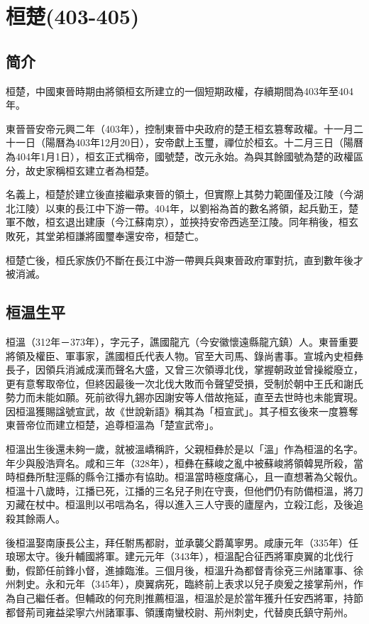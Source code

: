 
\section{桓楚\tiny(403-405)}

\subsection{简介}

桓楚，中國東晉時期由將領桓玄所建立的一個短期政權，存續期間為403年至404年。

東晉晉安帝元興二年（403年），控制東晉中央政府的楚王桓玄篡奪政權。十一月二十一日（陽曆為403年12月20日），安帝獻上玉璽，禪位於桓玄。十二月三日（陽曆為404年1月1日），桓玄正式稱帝，國號楚，改元永始。為與其餘國號為楚的政權區分，故史家稱桓玄建立者為桓楚。

名義上，桓楚於建立後直接繼承東晉的領土，但實際上其勢力範圍僅及江陵（今湖北江陵）以東的長江中下游一帶。404年，以劉裕為首的數名將領，起兵勤王，楚軍不敵，桓玄退出建康（今江蘇南京），並挾持安帝西逃至江陵。同年稍後，桓玄敗死，其堂弟桓謙將國璽奉還安帝，桓楚亡。

桓楚亡後，桓氏家族仍不斷在長江中游一帶興兵與東晉政府軍對抗，直到數年後才被消滅。

\subsection{桓温生平}

桓溫（312年－373年），字元子，譙國龍亢（今安徽懷遠縣龍亢鎮）人。東晉重要將領及權臣、軍事家，譙國桓氏代表人物。官至大司馬、錄尚書事。宣城內史桓彝長子，因領兵消滅成漢而聲名大盛，又曾三次領導北伐，掌握朝政並曾操縱廢立，更有意奪取帝位，但終因最後一次北伐大敗而令聲望受損，受制於朝中王氏和謝氏勢力而未能如願。死前欲得九錫亦因謝安等人借故拖延，直至去世時也未能實現。因桓溫獲賜諡號宣武，故《世說新語》稱其為「桓宣武」。其子桓玄後來一度篡奪東晉帝位而建立桓楚，追尊桓溫為「楚宣武帝」。

桓溫出生後還未夠一歲，就被溫嶠稱許，父親桓彝於是以「溫」作為桓溫的名字。年少與殷浩齊名。咸和三年（328年），桓彝在蘇峻之亂中被蘇峻將領韓晃所殺，當時桓彝所駐涇縣的縣令江播亦有協助。桓溫當時極度痛心，且一直想著為父報仇。桓溫十八歲時，江播已死，江播的三名兒子則在守喪，但他們仍有防備桓溫，將刀刃藏在杖中。桓溫則以弔唁為名，得以進入三人守喪的廬屋內，立殺江彪，及後追殺其餘兩人。

後桓溫娶南康長公主，拜任駙馬都尉，並承襲父爵萬寧男。咸康元年（335年）任琅琊太守。後升輔國將軍。建元元年（343年），桓溫配合征西將軍庾翼的北伐行動，假節任前鋒小督，進據臨淮。三個月後，桓溫升為都督青徐兗三州諸軍事、徐州刺史。永和元年（345年），庾翼病死，臨終前上表求以兒子庾爰之接掌荊州，作為自己繼任者。但輔政的何充則推薦桓溫，桓溫於是於當年獲升任安西將軍，持節都督荊司雍益梁寧六州諸軍事、領護南蠻校尉、荊州刺史，代替庾氏鎮守荊州。

